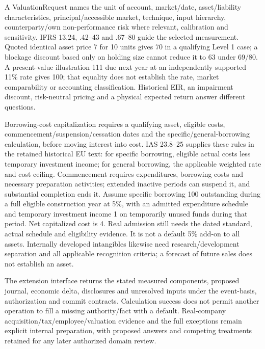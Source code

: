 A ValuationRequest names the unit of account, market/date, asset/liability characteristics, principal/accessible market, technique, input hierarchy, counterparty/own non-performance risk where relevant, calibration and sensitivity. IFRS 13.24, .42--43 and .67--80 guide the selected measurement. Quoted identical asset price 7 for 10 units gives 70 in a qualifying Level 1 case; a blockage discount based only on holding size cannot reduce it to 63 under 69/80. A present-value illustration 111 due next year at an independently supported 11\% rate gives 100; that equality does not establish the rate, market comparability or accounting classification. Historical EIR, an impairment discount, risk-neutral pricing and a physical expected return answer different questions.

Borrowing-cost capitalization requires a qualifying asset, eligible costs, commencement/suspension/cessation dates and the specific/general-borrowing calculation, before moving interest into cost. IAS 23.8--25 supplies these rules in the retained historical EU text: for specific borrowing, eligible actual costs less temporary investment income; for general borrowing, the applicable weighted rate and cost ceiling. Commencement requires expenditures, borrowing costs and necessary preparation activities; extended inactive periods can suspend it, and substantial completion ends it. Assume specific borrowing 100 outstanding during a full eligible construction year at 5\%, with an admitted expenditure schedule and temporary investment income 1 on temporarily unused funds during that period. Net capitalized cost is 4. Real admission still needs the dated standard, actual schedule and eligibility evidence. It is not a default 5\% add-on to all assets. Internally developed intangibles likewise need research/development separation and all applicable recognition criteria; a forecast of future sales does not establish an asset.

The extension interface returns the stated measured components, proposed journal, economic delta, disclosures and unresolved inputs under the event-basis, authorization and commit contracts. Calculation success does not permit another operation to fill a missing authority/fact with a default. Real-company acquisition/tax/employee/valuation evidence and the full exceptions remain explicit internal preparation, with proposed answers and competing treatments retained for any later authorized domain review.
